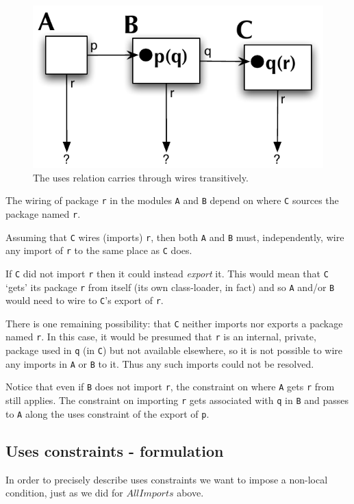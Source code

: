\documentclass[a4paper,12pt]{article}
\begin{document}
\begin{figure}[h]
\centering
\includegraphics*[scale=0.7]{usesCase2.pdf}
\caption[Transitive uses]{The uses relation carries through wires transitively.}
\label{fig:uses2}
\end{figure}

The wiring of package {\tt r} in the modules {\tt A} and {\tt B} depend on where {\tt C} sources the package named {\tt r}.

Assuming that {\tt C} wires (imports) {\tt r}, then both {\tt A} and {\tt B} must, independently, wire any import of {\tt r} to the same place as {\tt C} does.

If {\tt C} did not import {\tt r} then it could instead \emph{export} it. This would mean that {\tt C} `gets' its package {\tt r} from itself (its own class-loader, in fact) and so {\tt A} and/or {\tt B} would need to wire to {\tt C}'s export of {\tt r}.

There is one remaining possibility: that {\tt C} neither imports nor exports a package named {\tt r}. In this case, it would be presumed that {\tt r} is an internal, private, package used in {\tt q} (in {\tt C}) but not available elsewhere, so it is not possible to wire any imports in {\tt A} or {\tt B} to it. Thus any such imports could not be resolved.

Notice that even if {\tt B} does not import {\tt r}, the constraint on where {\tt A} gets {\tt r} from still applies. The constraint on importing {\tt r} gets associated with {\tt q} in {\tt B} and passes to {\tt A} along the uses constraint of the export of {\tt p}.

\subsection{Uses constraints - formulation}
In order to precisely describe uses constraints we want to impose a non-local condition, just as we did for $AllImports$ above.
\end{document}
